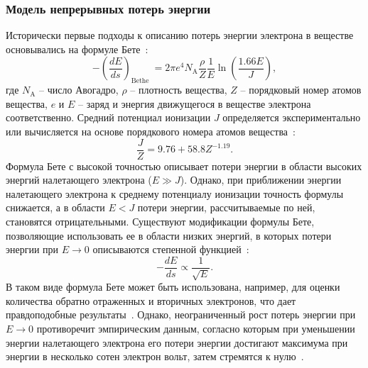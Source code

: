 \subsubsection{Модель непрерывных потерь энергии}
Исторически первые подходы к описанию потерь энергии электрона в веществе основывались на формуле Бете~\cite{Bethe}:
\begin{equation}
	-\left(\frac{d E}{d s}\right)_{\text {Bethe }}=2 \pi e^4 N_\mathrm{A} \frac{\rho}{Z} \frac{1}{E} \ln \left(\frac{1.66 E}{J}\right),
\end{equation}
где $N_\mathrm{A}$ -- число Авогадро, $\rho$ -- плотность вещества, $Z$ -- порядковый номер атомов вещества, $e$ и $E$ -- заряд и энергия движущегося в веществе электрона соответственно. Средний потенциал ионизации $J$ определяется экспериментально или вычисляется на основе порядкового номера атомов вещества~\cite{Dapor_large_book}:
\begin{equation}
	\frac{J}{Z} = 9.76 + 58.8 Z^{-1.19}.
\end{equation}
Формула Бете с высокой точностью описывает потери энергии в области высоких энергий налетающего электрона ($E \gg J$). Однако, при приближении энергии налетающего электрона к среднему потенциалу ионизации точность формулы снижается, а в области $E < J$ потери энергии, рассчитываемые по ней, становятся отрицательными. Существуют модификации формулы Бете, позволяющие использовать ее в области низких энергий, в которых потери энергии при $E \rightarrow 0$ описываются степенной функцией~\cite{Bethe_corrected}:
\begin{equation}
	-\frac{dE}{ds} \propto \frac{1}{\sqrt{E}}.
\end{equation}
В таком виде формула Бете может быть использована, например, для оценки количества обратно отраженных и вторичных электронов, что дает правдоподобные результаты~\cite{Bethe_corr_2ndary_e}. Однако, неограниченный рост потерь энергии при $E \rightarrow 0$ противоречит эмпирическим данным, согласно которым при уменьшении энергии налетающего электрона его потери энергии достигают максимума при энергии в несколько сотен электрон вольт, затем стремятся к нулю~\cite{Shimizu_Review}.


